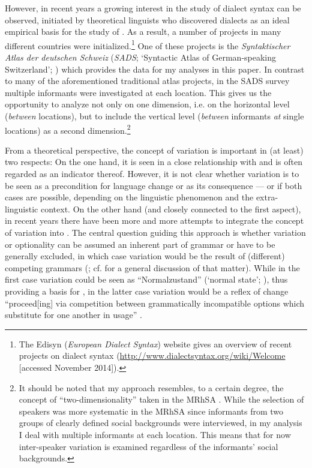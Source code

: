 \documentclass[output=paper]{LSP/langsci}
\begin{document}
However, in recent years a growing interest in the study of dialect syntax can be observed, initiated by theoretical linguists who discovered dialects as an ideal empirical basis for the study of  \citep{kayne_microparametric_1996}. As a result, a number of projects in many different countries were initialized.\footnote{ The Edisyn (\emph{European Dialect Syntax}) website gives an overview of recent projects on dialect syntax (\url{http://www.dialectsyntax.org/wiki/Welcome} [accessed November 2014]).} One of these projects is the \emph{Syntaktischer Atlas der deutschen Schweiz} (\emph{SADS}; ‘Syntactic Atlas of German-speaking Switzerland’; \citealt{bucheli_syntactic_2002}) which provides the data for my analyses in this paper. In contrast to many of the aforementioned traditional atlas projects, in the SADS survey multiple informants were investigated at each location. This gives us the opportunity to analyze  not only on one dimension, i.e. on the horizontal level (\emph{between} locations), but to include the vertical level (\emph{between} informants \emph{at} single locations) as a second dimension.\footnote{It should be noted that my approach resembles, to a certain degree, the concept of “two-dimensionality” taken in the MRhSA \citep{bellmann_zur_1997}. While the selection of speakers was more systematic in the MRhSA since informants from two groups of clearly defined social backgrounds were interviewed, in my analysis I deal with multiple informants at each location. This means that for now inter-speaker variation is examined regardless of the informants’ social backgrounds.} 

From a theoretical perspective, the concept of variation is important in (at least) two respects: On the one hand, it is seen in a close relationship with  and is often regarded as an indicator thereof. However, it is not clear whether variation is to be seen as a precondition for language change or as its consequence \citep[39--40]{glaser_wandel_2014} --- or if both cases are possible, depending on the linguistic phenomenon and the extra-linguistic context. On the other hand (and closely connected to the first aspect), in recent years there have been more and more attempts to integrate the concept of variation into  \citep{cornips_syntax_2005}. The central question guiding this approach is whether variation or optionality can be assumed an inherent part of grammar \citep{seiler_syntaxgeographie_2008} or have to be generally excluded, in which case variation would be the result of (different) competing grammars (\citealt{kroch_morphosyntactic_1994}; cf. \citealt{Henry2002} for a general discussion of that matter). While in the first case variation could be seen as “Normalzustand” (‘normal state’; \citealt[56]{seiler_syntaxgeographie_2008}), thus providing a basis for , in the latter case variation would be a reflex of change “proceed[ing] via competition between grammatically incompatible options which substitute for one another in usage” \citep[180]{kroch_morphosyntactic_1994}.
\end{document}
